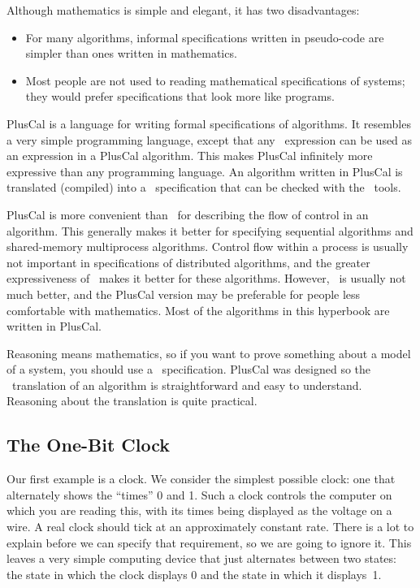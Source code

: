 \documentclass[fleqn,leqno]{article}
\begin{document}
Although mathematics is simple and elegant, it has two disadvantages:
\begin{itemize}
\item For many algorithms, informal specifications written in
pseudo-code are simpler than ones written in mathematics.

\item Most people are not used to reading mathematical specifications
of systems; they would prefer specifications that look more like
programs.
\end{itemize}
%
PlusCal 
is a language for writing formal specifications of algorithms.
It resembles a very simple programming language, except that any
\tlaplus\ expression can be used as an expression in a PlusCal
algorithm.  This makes PlusCal infinitely more expressive than any
programming language.  An algorithm written in PlusCal is translated
(compiled) into a \tlaplus\ specification that can be checked with the
\tlaplus\ tools.

PlusCal is more convenient than \tlaplus\ for describing the flow of
control in an algorithm.  This generally makes it better for
specifying sequential algorithms and shared-memory multiprocess
algorithms.  Control flow within a process is usually not important in
specifications of distributed algorithms, and the greater
expressiveness of \tlaplus\ makes it better for these algorithms.
However, \tlaplus\ is usually not much better, and the PlusCal version
may be preferable for people less comfortable with mathematics.  
Most of the algorithms in this hyperbook are written in PlusCal.

Reasoning means mathematics, so if you want to prove something about a
model of a system, you should use a \tlaplus\ specification.  PlusCal
was designed so the \tlaplus\ translation of an algorithm is 
straightforward and easy to understand.  Reasoning about the
translation is quite practical.

 
\begin{en}
\newpage
 \vspace{-\baselineskip}%
\section{The One-Bit Clock}

Our first example is a clock.  We consider the simplest possible
clock: one that alternately shows the ``times'' 0 and 1.  Such a clock
controls the computer on which you are reading this, with its times
being displayed as the voltage on a wire.  A real clock should tick at
an approximately constant rate.  There is a lot to explain before we
can specify that requirement, so we are going to ignore it.  This
leaves a very simple computing device that just alternates between two
states: the state in which the clock displays 0 and the state in which
it displays~1.
\end{en}
\end{document}
